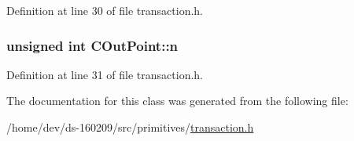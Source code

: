 Definition at line 30 of file transaction.\+h.

\hypertarget{class_c_out_point_a9fbc648ca0d11421ad66e897185a9b58}{}
\subsubsection[{n}]{\setlength{\rightskip}{0pt plus 5cm}unsigned int C\+Out\+Point\+::n}\label{class_c_out_point_a9fbc648ca0d11421ad66e897185a9b58}


Definition at line 31 of file transaction.\+h.



The documentation for this class was generated from the following file\+:\begin{DoxyCompactItemize}
\item 
/home/dev/ds-\/160209/src/primitives/\hyperlink{transaction_8h}{transaction.\+h}\end{DoxyCompactItemize}
